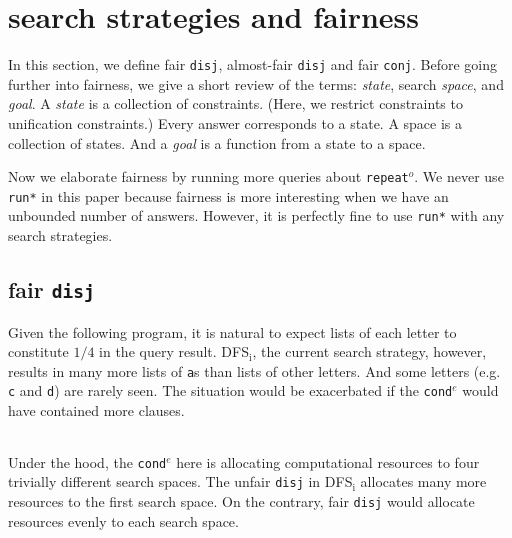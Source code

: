\documentclass[format=acmlarge, review=true, authordraft=true]{acmart}
\newcommand{\conde}{\texttt{cond$^e$}}
\newcommand{\conj}{\texttt{conj}}
\newcommand{\disj}{\texttt{disj}}
\newcommand{\repeato}{\texttt{repeat$^o$}}
\newcommand{\DFSi }[0]{DFS$_\textrm{i}$}
\begin{document}
\section{search strategies and fairness}

In this section, we define fair \disj{}, almost-fair \disj{} and fair \conj{}. 
Before going further into fairness, we give a short review of the terms:
\emph{state}, search \emph{space}, and \emph{goal}.
A \emph{state} is a collection of constraints. (Here, we restrict 
constraints to unification constraints.) Every answer corresponds to a 
state. A space is a collection of states. And a \emph{goal} is a 
function from a state to a space.



Now we elaborate fairness by running more queries about \repeato{}. We never use 
\texttt{run*} in this paper because fairness is more interesting when we have 
an unbounded number of answers. However, it is perfectly fine to use 
\texttt{run*} with any search strategies.

\subsection{fair \texttt{disj}}

Given the following program, it is natural to expect lists of each letter to
constitute $1/4$ in the query result. \DFSi, the current search
strategy, however, results in many more lists of \texttt{a}s than lists
of other letters. And some letters  (e.g. \texttt{c} and \texttt{d}) are
rarely seen. The situation would be exacerbated if the \conde{} would have
contained more clauses.

\begin{center}
	\begin{tabular}{c}
		
	\end{tabular}
\end{center}

Under the hood, the \conde{} here is allocating computational resources to 
four trivially different search spaces. The unfair \disj{} in 
\DFSi{} allocates many more resources to the first search space. On the 
contrary, fair \disj{} would allocate resources evenly to each search space. 
\end{document}

